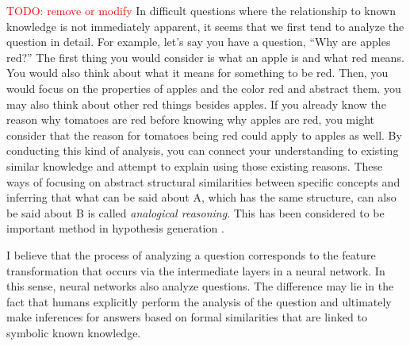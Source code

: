 \textcolor{red}{TODO: remove or modify}
In difficult questions where the relationship to known knowledge is not immediately apparent, it seems that we first tend to analyze the question in detail. For example, let's say you have a question, ``Why are apples red?'' The first thing you would consider is what an apple is and what red means. You would also think about what it means for something to be red. Then, you would focus on the properties of apples and the color red and abstract them. you may also think about other red things besides apples. If you already know the reason why tomatoes are red before knowing why apples are red, you might consider that the reason for tomatoes being red could apply to apples as well. By conducting this kind of analysis, you can connect your understanding to existing similar knowledge and attempt to explain using those existing reasons. These ways of focusing on abstract structural similarities between specific concepts and inferring that what can be said about A, which has the same structure, can also be said about B is called \textit{analogical reasoning}. This has been considered to be important method in hypothesis generation \cite{thagard_1984}.

I believe that the process of analyzing a question corresponds to the feature transformation that occurs via the intermediate layers in a neural network. In this sense, neural networks also analyze questions. The difference may lie in the fact that humans explicitly perform the analysis of the question and ultimately make inferences for answers based on formal similarities that are linked to symbolic known knowledge.



